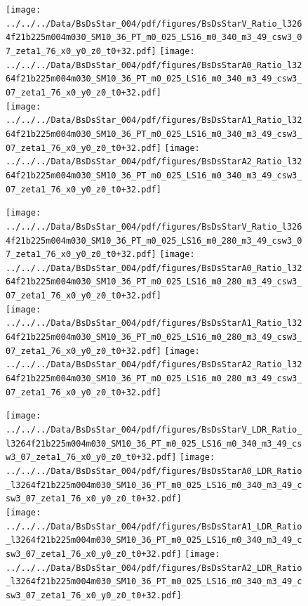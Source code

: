 \documentclass[a4paper,10pt]{article}
\begin{document}
\begin{figure}[p]
 \texttt{[image: ../../../Data/BsDsStar\_004/pdf/figures/BsDsStarV\_Ratio\_l3264f21b225m004m030\_SM10\_36\_PT\_m0\_025\_LS16\_m0\_340\_m3\_49\_csw3\_07\_zeta1\_76\_x0\_y0\_z0\_t0+32.pdf]}  
\texttt{[image: ../../../Data/BsDsStar\_004/pdf/figures/BsDsStarA0\_Ratio\_l3264f21b225m004m030\_SM10\_36\_PT\_m0\_025\_LS16\_m0\_340\_m3\_49\_csw3\_07\_zeta1\_76\_x0\_y0\_z0\_t0+32.pdf]} \\ 
\texttt{[image: ../../../Data/BsDsStar\_004/pdf/figures/BsDsStarA1\_Ratio\_l3264f21b225m004m030\_SM10\_36\_PT\_m0\_025\_LS16\_m0\_340\_m3\_49\_csw3\_07\_zeta1\_76\_x0\_y0\_z0\_t0+32.pdf]}  
\texttt{[image: ../../../Data/BsDsStar\_004/pdf/figures/BsDsStarA2\_Ratio\_l3264f21b225m004m030\_SM10\_36\_PT\_m0\_025\_LS16\_m0\_340\_m3\_49\_csw3\_07\_zeta1\_76\_x0\_y0\_z0\_t0+32.pdf]} \\ 
\end{figure} 
\clearpage

\begin{figure}[p]
 \texttt{[image: ../../../Data/BsDsStar\_004/pdf/figures/BsDsStarV\_Ratio\_l3264f21b225m004m030\_SM10\_36\_PT\_m0\_025\_LS16\_m0\_280\_m3\_49\_csw3\_07\_zeta1\_76\_x0\_y0\_z0\_t0+32.pdf]}  
\texttt{[image: ../../../Data/BsDsStar\_004/pdf/figures/BsDsStarA0\_Ratio\_l3264f21b225m004m030\_SM10\_36\_PT\_m0\_025\_LS16\_m0\_280\_m3\_49\_csw3\_07\_zeta1\_76\_x0\_y0\_z0\_t0+32.pdf]} \\ 
\texttt{[image: ../../../Data/BsDsStar\_004/pdf/figures/BsDsStarA1\_Ratio\_l3264f21b225m004m030\_SM10\_36\_PT\_m0\_025\_LS16\_m0\_280\_m3\_49\_csw3\_07\_zeta1\_76\_x0\_y0\_z0\_t0+32.pdf]}  
\texttt{[image: ../../../Data/BsDsStar\_004/pdf/figures/BsDsStarA2\_Ratio\_l3264f21b225m004m030\_SM10\_36\_PT\_m0\_025\_LS16\_m0\_280\_m3\_49\_csw3\_07\_zeta1\_76\_x0\_y0\_z0\_t0+32.pdf]} \\ 
\end{figure} 
\clearpage

\begin{figure}[p]
 \texttt{[image: ../../../Data/BsDsStar\_004/pdf/figures/BsDsStarV\_LDR\_Ratio\_l3264f21b225m004m030\_SM10\_36\_PT\_m0\_025\_LS16\_m0\_340\_m3\_49\_csw3\_07\_zeta1\_76\_x0\_y0\_z0\_t0+32.pdf]}  
\texttt{[image: ../../../Data/BsDsStar\_004/pdf/figures/BsDsStarA0\_LDR\_Ratio\_l3264f21b225m004m030\_SM10\_36\_PT\_m0\_025\_LS16\_m0\_340\_m3\_49\_csw3\_07\_zeta1\_76\_x0\_y0\_z0\_t0+32.pdf]} \\ 
\texttt{[image: ../../../Data/BsDsStar\_004/pdf/figures/BsDsStarA1\_LDR\_Ratio\_l3264f21b225m004m030\_SM10\_36\_PT\_m0\_025\_LS16\_m0\_340\_m3\_49\_csw3\_07\_zeta1\_76\_x0\_y0\_z0\_t0+32.pdf]}  
\texttt{[image: ../../../Data/BsDsStar\_004/pdf/figures/BsDsStarA2\_LDR\_Ratio\_l3264f21b225m004m030\_SM10\_36\_PT\_m0\_025\_LS16\_m0\_340\_m3\_49\_csw3\_07\_zeta1\_76\_x0\_y0\_z0\_t0+32.pdf]} \\ 
\end{figure} 
\clearpage
\end{document}
